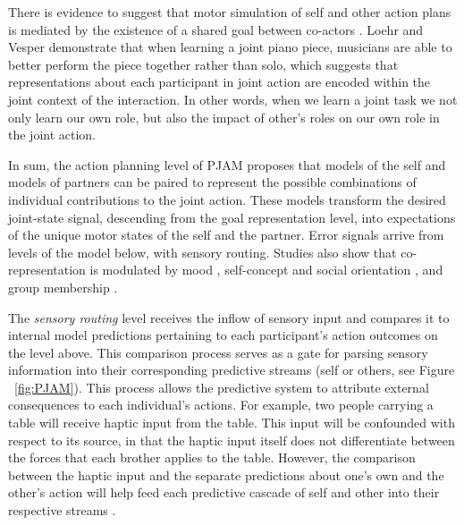 \begin{CJK}{UTF8}{gbsn}
There is evidence to suggest that motor simulation of self and other action plans is mediated by the existence of a shared goal between co-actors \citep{Kourtis2010}.  Loehr and Vesper \textcite{Loehr2016} demonstrate that when learning a joint piano piece, musicians are able to better perform the piece together rather than solo, which suggests that representations about each participant in joint action are encoded within the joint context of the interaction.  In other words, when we learn a joint task we not only learn our own role, but also the impact of other's roles on our own role in the joint action.

In sum, the action planning level of PJAM proposes that models of the self and models of partners can be paired to represent the possible combinations of individual contributions to the joint action. These models transform the desired joint-state signal, descending from the goal representation level, into expectations of the unique motor states of the self and the partner.  Error signals arrive from levels of the model below, with sensory routing.  Studies also show that co-representation is modulated by mood \citep[positive or negative affect, see][]{Kuhbandner2010}, self-concept and social orientation \citep{Colzato2012,Colzato2012a}, and group membership \citep{DeBruijn2008,Iani2013}.

The \textit{sensory routing} level receives the inflow of sensory input and compares it to internal model predictions pertaining to each participant's action outcomes on the level above.  This comparison process serves as a gate for parsing sensory information into their corresponding predictive streams (self or others, see Figure ~\ref{fig:PJAM}). This process allows the predictive system to attribute external consequences to each individual’s actions.   For example, two people carrying a table will receive haptic input from the table. This input will be confounded with respect to its source, in that the haptic input itself does not differentiate between the forces that each brother applies to the table. However, the comparison between the haptic input and the separate predictions about one’s own and the other’s action will help feed each predictive cascade of self and other into their respective streams \citep{Pesquita2017}.


\end{CJK}
